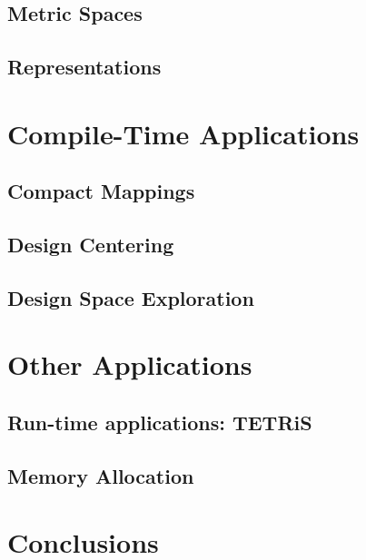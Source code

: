 \documentclass{report}
\begin{document}
\section{Metric Spaces}
\section{Representations}
%

\chapter{Compile-Time Applications}
\label{chap:mapping_applications}

\section{Compact Mappings}
\section{Design Centering}
\section{Design Space Exploration}

\chapter{Other Applications}

\section{Run-time applications: TETRiS}
\section{Memory Allocation}

\chapter{Conclusions}

\end{document}
